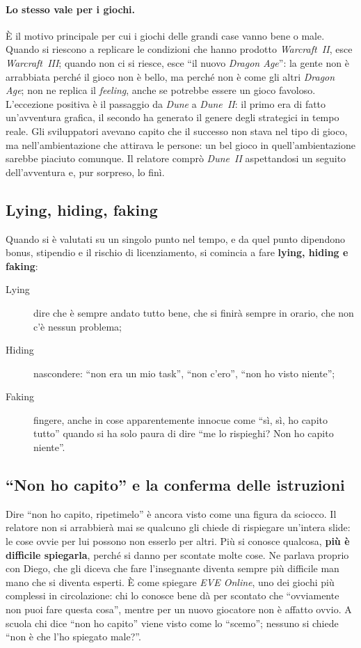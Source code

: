 \paragraph{Lo stesso vale per i giochi.} È il motivo principale per cui i
giochi delle grandi case vanno bene o male. Quando si riescono a replicare le
condizioni che hanno prodotto \emph{Warcraft~II}, esce \emph{Warcraft~III};
quando non ci si riesce, esce ``il nuovo \emph{Dragon Age}'': la gente non è
arrabbiata perché il gioco non è bello, ma perché non è come gli altri
\emph{Dragon Age}; non ne replica il \emph{feeling}, anche se potrebbe
essere un gioco favoloso. L'eccezione positiva è il passaggio da \emph{Dune} a
\emph{Dune~II}: il primo era di fatto un'avventura grafica, il secondo ha
generato il genere degli strategici in tempo reale. Gli sviluppatori avevano
capito che il successo non stava nel tipo di gioco, ma nell'ambientazione che
attirava le persone: un bel gioco in quell'ambientazione sarebbe piaciuto
comunque. Il relatore comprò \emph{Dune~II} aspettandosi un seguito
dell'avventura e, pur sorpreso, lo finì.

\subsection{Lying, hiding, faking}

Quando si è valutati su un singolo punto nel tempo, e da quel punto dipendono
bonus, stipendio e il rischio di licenziamento, si comincia a fare
\textbf{lying, hiding e faking}:
\begin{description}
  \item[Lying] dire che è sempre andato tutto bene, che si finirà sempre in
        orario, che non c'è nessun problema;
  \item[Hiding] nascondere: ``non era un mio task'', ``non c'ero'', ``non ho
        visto niente'';
  \item[Faking] fingere, anche in cose apparentemente innocue come ``sì, sì,
        ho capito tutto'' quando si ha solo paura di dire ``me lo rispieghi?
        Non ho capito niente''.
\end{description}

\subsection{``Non ho capito'' e la conferma delle istruzioni}

Dire ``non ho capito, ripetimelo'' è ancora visto come una figura da sciocco.
Il relatore non si arrabbierà mai se qualcuno gli chiede di rispiegare
un'intera slide: le cose ovvie per lui possono non esserlo per altri. Più si
conosce qualcosa, \textbf{più è difficile spiegarla}, perché si danno per
scontate molte cose. Ne parlava proprio con Diego, che gli diceva che fare
l'insegnante diventa sempre più difficile man mano che si diventa esperti. È
come spiegare \emph{EVE Online}, uno dei giochi più complessi in circolazione:
chi lo conosce bene dà per scontato che ``ovviamente non puoi fare questa
cosa'', mentre per un nuovo giocatore non è affatto ovvio. A scuola chi dice
``non ho capito'' viene visto come lo ``scemo''; nessuno si chiede ``non è che
l'ho spiegato male?''.

